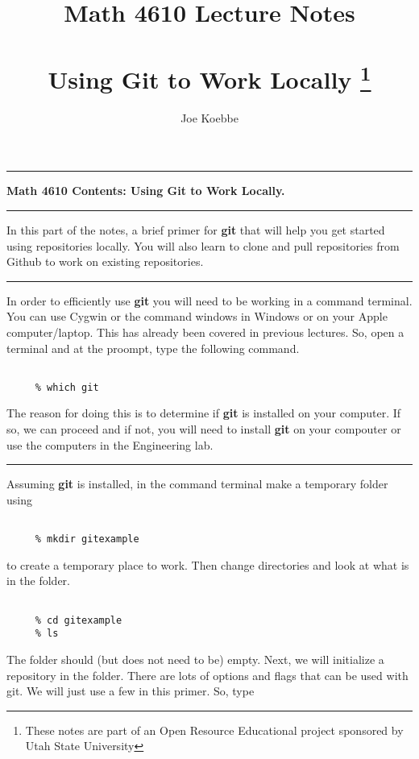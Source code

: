\documentclass[10pt,fleqn]{article}
\title{Math 4610 Lecture Notes \\
            \ \\
       Using Git to Work Locally
  \footnote{These notes are part of an Open Resource Educational project
            sponsored by Utah State University}}
\author{Joe Koebbe}
\begin{document}
\maketitle
\newpage
\vskip0.1in\hrule\vskip0.1in
\noindent
{\bf Math 4610 Contents: Using Git to Work Locally.} 
\vskip0.1in\hrule\vskip0.1in
\noindent
In this part of the notes, a brief primer for {\bf git} that will help you get
started using repositories locally. You will also learn to clone and pull
repositories from Github to work on existing repositories.
\vskip0.1in\hrule\vskip0.1in
\noindent
In order to efficiently use {\bf git} you will need to be working in a command
terminal. You can use Cygwin or the command windows in Windows or on your Apple
computer/laptop. This has already been covered in previous lectures. So, open
a terminal and at the proompt, type the following command.
\begin{verbatim}

     % which git

\end{verbatim}
The reason for doing this is to determine if {\bf git} is installed on your
computer. If so, we can proceed and if not, you will need to install {\bf git}
on your compouter or use the computers in the Engineering lab.
\vskip0.1in\hrule\vskip0.1in
\noindent
Assuming {\bf git} is installed, in the command terminal make a temporary
folder using
\begin{verbatim}

     % mkdir gitexample

\end{verbatim}
to create a temporary place to work. Then change directories and look at what is
in the folder.
\begin{verbatim}

     % cd gitexample
     % ls

\end{verbatim}
The folder should (but does not need to be) empty. Next, we will initialize a
repository in the folder. There are lots of options and flags that can be used
with git. We will just use a few in this primer. So, type
\end{document}

